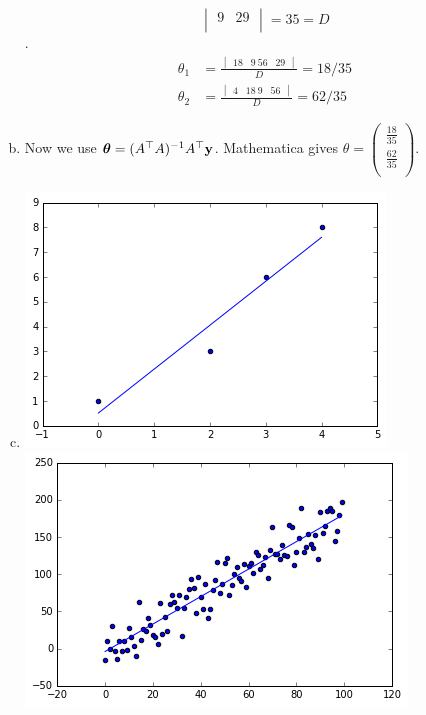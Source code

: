 \documentclass[12pt,letterpaper,fleqn]{hmcpset}
\begin{document}
\begin{enumerate}[(a)]
$$\begin{vmatrix}
                 9 & 29 \\
            \end{vmatrix} = 35 = D$$.
        \begin{align*}
            \theta_1 &= \frac{
                \begin{vmatrix}
                    18 & 9\
                    56 & 29
                \end{vmatrix}
            }{D} = 18/35\\
            \theta_2 &= \frac{
                \begin{vmatrix}
                    4 & 18\
                    9 & 56
                \end{vmatrix}
            }{D} =62/35
        \end{align*}
         
    \item
        Now we use $\hbox{\boldmath$\theta$} = (A^\top A)^{-1}A^\top {\bf y}$. Mathematica gives 
        $\theta = \left(
\begin{array}{c}
 \frac{18}{35} \\
 \frac{62}{35} \\
\end{array}
\right)$.

    \item
        
        \includegraphics[scale = .5]{linregc.png}\\
        \includegraphics[scale = .5]{linregd.png}
         
\end{enumerate}
\newpage
\end{document}
